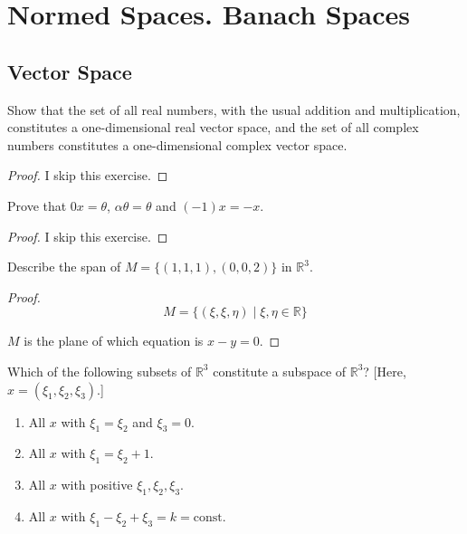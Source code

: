 \chapter{Normed Spaces. Banach Spaces}

\section{Vector Space}

\begin{exercise}\label{chapter2:section1:exercise1}
    Show that the set of all real numbers, with the usual addition and multiplication, constitutes a one-dimensional real vector space, and the set of all complex numbers constitutes a one-dimensional complex vector space.
\end{exercise}

\begin{proof}
    I skip this exercise.
\end{proof}
\newpage

\begin{exercise}\label{chapter2:section1:exercise2}
    Prove that $0x = \theta$, $\alpha\theta = \theta$ and $(-1)x = -x$.
\end{exercise}

\begin{proof}
    I skip this exercise.
\end{proof}

\begin{exercise}\label{chapter2:section1:exercise3}
    Describe the span of $M = \{ (1, 1, 1), (0, 0, 2) \}$ in $\mathbb{R}^{3}$.
\end{exercise}

\begin{proof}
    \[
        M = \{ (\xi, \xi, \eta) \mid \xi, \eta\in\mathbb{R} \}
    \]

    $M$ is the plane of which equation is $x - y = 0$.
\end{proof}

\begin{exercise}\label{chapter2:section1:exercise4}
    Which of the following subsets of $\mathbb{R}^{3}$ constitute a subspace of $\mathbb{R}^{3}$? [Here, $x = (\xi_{1}, \xi_{2}, \xi_{3})$.]
    \begin{enumerate}[label={(\alph*)}]
        \item All $x$ with $\xi_{1} = \xi_{2}$ and $\xi_{3} = 0$.
        \item All $x$ with $\xi_{1} = \xi_{2} + 1$.
        \item All $x$ with positive $\xi_{1}, \xi_{2}, \xi_{3}$.
        \item All $x$ with $\xi_{1} - \xi_{2} + \xi_{3} = k = \text{const}$.
    \end{enumerate}
\end{exercise}


